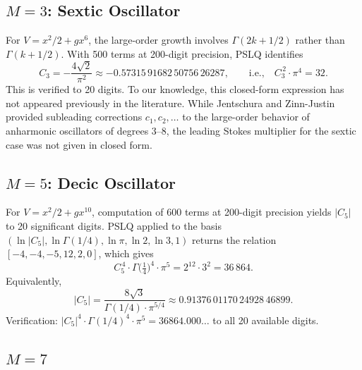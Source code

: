 \documentclass[12pt,a4paper]{article}
\numberwithin{equation}{section}
\theoremstyle{plain}
\theoremstyle{definition}
\theoremstyle{remark}
\begin{document}
\subsection{$M = 3$: Sextic Oscillator}
\label{sec:M3}

For $V = x^2/2 + gx^6$, the large-order growth involves
$\Gamma(2k + 1/2)$ rather than $\Gamma(k + 1/2)$. With 500 terms at
200-digit precision, PSLQ identifies
\begin{equation}\label{eq:C3-closed}
  C_3 = -\frac{4\sqrt{2}}{\pi^2}
  \approx -0.57315\,91682\,50756\,26287,
  \qquad\text{i.e.,}\quad
  C_3^{\,2} \cdot \pi^4 = 32.
\end{equation}
This is verified to 20 digits. To our knowledge, this closed-form
expression has not appeared previously in the literature.
While Jentschura and Zinn-Justin~\cite{ZJJ2010} provided subleading
corrections $c_1, c_2, \ldots$ to the large-order behavior of anharmonic
oscillators of degrees 3--8, the leading Stokes multiplier for the
sextic case was not given in closed form.

\subsection{$M = 5$: Decic Oscillator}
\label{sec:M5}

For $V = x^2/2 + gx^{10}$, computation of 600 terms at 200-digit precision
yields $|C_5|$ to 20 significant digits. PSLQ applied to the basis
$(\ln|C_5|, \ln\Gamma(1/4), \ln\pi, \ln 2, \ln 3, 1)$
returns the relation $[-4, -4, -5, 12, 2, 0]$, which gives
\begin{equation}\label{eq:C5-closed}
  \boxed{C_5^{\,4} \cdot \Gamma\!\bigl(\tfrac{1}{4}\bigr)^4 \cdot \pi^5
  = 2^{12} \cdot 3^2 = 36\,864.}
\end{equation}
Equivalently,
\begin{equation}\label{eq:C5-value}
  |C_5| = \frac{8\sqrt{3}}{\Gamma(1/4) \cdot \pi^{5/4}}
  \approx 0.91376\,01170\,24928\,46899.
\end{equation}
Verification: $|C_5|^4 \cdot \Gamma(1/4)^4 \cdot \pi^5 = 36864.000\ldots$
to all 20 available digits.

\subsection{$M = 7$}
\label{sec:M7}
\end{document}
